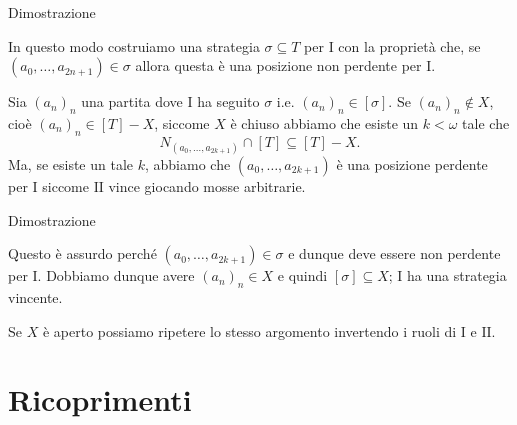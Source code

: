 \documentclass[aspectratio=43]{beamer}
\begin{document}
\begin{frame}{Dimostrazione}
  \begin{block}{}
    In questo modo costruiamo una strategia \(\sigma \subseteq T\) per \(\mathrm{I}\) con la proprietà che, se \((a_0, \ldots, a_{2n+1}) \in \sigma\) allora questa è una posizione non perdente per \(\mathrm{I}\).
  \end{block}
  \pause
  \begin{block}{}
    Sia \((a_n)_n\) una partita dove \(\mathrm{I}\) ha seguito \(\sigma\) i.e. \((a_n)_n \in [\sigma]\).
    Se \((a_n)_n \not\in X\), cioè \((a_n)_n \in [T] - X\), siccome \(X\) è chiuso abbiamo che esiste un \(k < \omega\) tale che
    \begin{equation*}
      N_{(a_0, \ldots, a_{2k+1})}\cap[T] \subseteq [T] - X.
    \end{equation*}
    Ma, se esiste un tale \(k\), abbiamo che \((a_0, \ldots, a_{2k+1})\) è una posizione perdente per \(\mathrm{I}\) siccome \(\mathrm{II}\) vince giocando mosse arbitrarie.

  \end{block}
\end{frame}

\begin{frame}{Dimostrazione}
  \begin{block}{}
    Questo è assurdo perché \((a_0, \ldots, a_{2k+1}) \in \sigma\) e dunque deve essere non perdente per \(\mathrm{I}\).
    Dobbiamo dunque avere \((a_n)_n \in X\) e quindi \([\sigma] \subseteq X\); \(\mathrm{I}\) ha una strategia vincente.
  \end{block}
  \pause
  \begin{block}{}
    Se \(X\) è aperto possiamo ripetere lo stesso argomento invertendo i ruoli di \(\mathrm{I}\) e \(\mathrm{II}\).
    \begin{flushright}
      \qedsymbol
    \end{flushright}
  \end{block}
\end{frame}

\section{Ricoprimenti}
\end{document}
